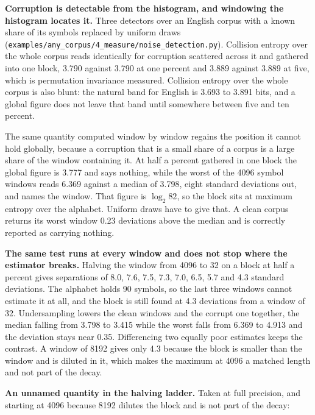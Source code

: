 \textbf{Corruption is detectable from the histogram, and windowing the histogram locates it.} Three detectors over an English corpus with a known share of its symbols replaced by uniform draws (\texttt{examples/\allowbreak{}any\_\allowbreak{}corpus/\allowbreak{}4\_\allowbreak{}measure/\allowbreak{}noise\_\allowbreak{}detection.\allowbreak{}py}). Collision entropy over the whole corpus reads identically for corruption scattered across it and gathered into one block, 3.790 against 3.790 at one percent and 3.889 against 3.889 at five, which is permutation invariance measured. Collision entropy over the whole corpus is also blunt: the natural band for English is 3.693 to 3.891 bits, and a global figure does not leave that band until somewhere between five and ten percent.

The same quantity computed window by window regains the position it cannot hold globally, because a corruption that is a small share of a corpus is a large share of the window containing it. At half a percent gathered in one block the global figure is 3.777 and says nothing, while the worst of the 4096 symbol windows reads 6.369 against a median of 3.798, eight standard deviations out, and names the window. That figure is \(\log_2 82\), so the block sits at maximum entropy over the alphabet. Uniform draws have to give that. A clean corpus returns its worst window 0.23 deviations above the median and is correctly reported as carrying nothing.

\textbf{The same test runs at every window and does not stop where the estimator breaks.} Halving the window from 4096 to 32 on a block at half a percent gives separations of 8.0, 7.6, 7.5, 7.3, 7.0, 6.5, 5.7 and 4.3 standard deviations. The alphabet holds 90 symbols, so the last three windows cannot estimate it at all, and the block is still found at 4.3 deviations from a window of 32. Undersampling lowers the clean windows and the corrupt one together, the median falling from 3.798 to 3.415 while the worst falls from 6.369 to 4.913 and the deviation stays near 0.35. Differencing two equally poor estimates keeps the contrast. A window of 8192 gives only 4.3 because the block is smaller than the window and is diluted in it, which makes the maximum at 4096 a matched length and not part of the decay.

\textbf{An unnamed quantity in the halving ladder.} Taken at full precision, and starting at 4096 because 8192 dilutes the block and is not part of the decay:

